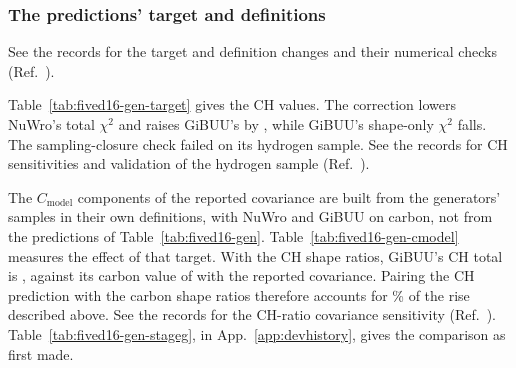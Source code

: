 \subsubsection{The predictions' target and definitions}
\label{sec:fived16-gen-target}
See the records for the target and definition changes and their numerical checks (Ref.~\cite{NoteRecords2026}).

Table~\ref{tab:fived16-gen-target} gives the CH values. The correction lowers NuWro's total $\chi^2$ and raises GiBUU's by , while GiBUU's shape-only $\chi^2$ falls. The sampling-closure check failed on its hydrogen sample. See the records for CH sensitivities and validation of the hydrogen sample (Ref.~\cite{NoteRecords2026}).


The $C_{\mathrm{model}}$ components of the reported covariance are built from the generators' samples in their own definitions, with NuWro and GiBUU on carbon, not from the predictions of Table~\ref{tab:fived16-gen}. Table~\ref{tab:fived16-gen-cmodel} measures the effect of that target. With the CH shape ratios, GiBUU's CH total is , against its carbon value of  with the reported covariance. Pairing the CH prediction with the carbon shape ratios therefore accounts for \% of the rise described above. See the records for the CH-ratio covariance sensitivity (Ref.~\cite{NoteRecords2026}). Table~\ref{tab:fived16-gen-stageg}, in App.~\ref{app:devhistory}, gives the comparison as first made.

